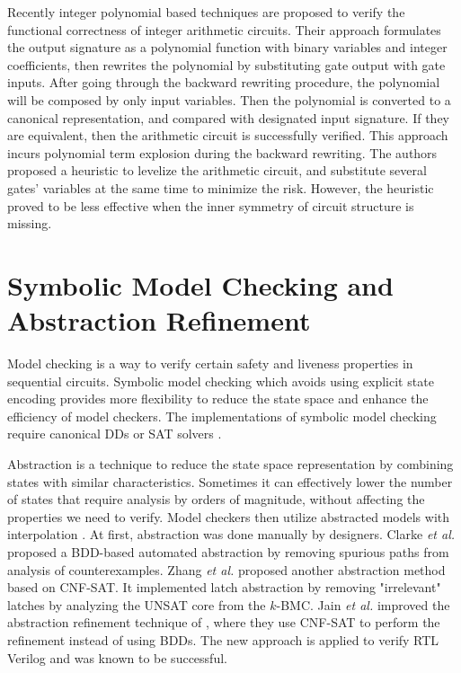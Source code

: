 Recently integer polynomial based techniques \cite{ciesielski2014function,rolf:date16} are proposed  to verify the functional 
correctness of integer arithmetic circuits. Their approach formulates the output signature as a polynomial function 
with binary variables and integer coefficients, then rewrites the polynomial by substituting gate output with gate 
inputs. After going through the backward rewriting procedure,  the polynomial
will be composed by only input variables. Then the polynomial is converted to a canonical representation, and compared
with designated input signature. If they are equivalent, then the arithmetic circuit is successfully verified.
This approach incurs polynomial term explosion during the backward rewriting. The authors proposed a heuristic
to levelize the arithmetic circuit, and substitute several gates' variables at the same time to minimize the risk. However, 
the heuristic proved to be less effective when the inner symmetry of circuit structure is missing.

  
\section{Symbolic Model Checking and Abstraction Refinement}
Model checking is a way to verify certain safety and liveness properties 
in sequential circuits. Symbolic model checking which avoids using explicit state encoding
provides more flexibility to reduce the state space and enhance the 
efficiency of model checkers. The implementations of symbolic model checking 
require canonical DDs or SAT solvers \cite{burch1990sequential,burch1991representing,biere1999symbolic}.

Abstraction is a technique to reduce the state space representation by combining states with similar 
characteristics. Sometimes it can effectively lower the number of states that require analysis by orders of magnitude,
without affecting the properties we need to verify. Model checkers then utilize abstracted models 
with interpolation \cite{mcmillan2003interpolation,mcmillan:cav06}.
At first, abstraction was done manually by designers. Clarke {\it et al.} \cite{clarke2000counterexample}
proposed a BDD-based automated abstraction by removing spurious paths from analysis of counterexamples. 
Zhang {\it et al.} \cite{zhang2005design} proposed another abstraction method based on CNF-SAT.
It implemented latch abstraction by removing "irrelevant" latches by analyzing the 
UNSAT core from the $k$-BMC. Jain {\it et al.} \cite{HimanshuDAC2005} improved the abstraction refinement technique of \cite{clarke2000counterexample},
where they use CNF-SAT to perform the refinement instead of using BDDs. The new approach is applied to verify RTL Verilog
and was known to be successful.

